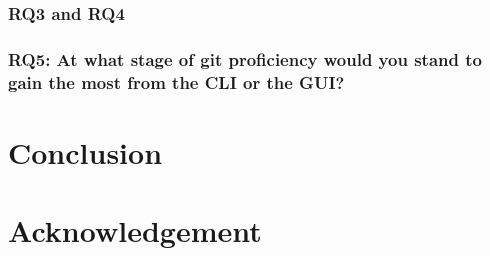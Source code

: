 \documentclass[a4paper,oneside]{bth} %
\begin{document}
		\subsection{RQ3 and RQ4}
		
		\subsection{RQ5: At what stage of git proficiency would you stand to gain the most from the CLI or the GUI?}
		
		\chapter{Conclusion}
		
		
		\chapter*{Acknowledgement}
		
\end{document}
